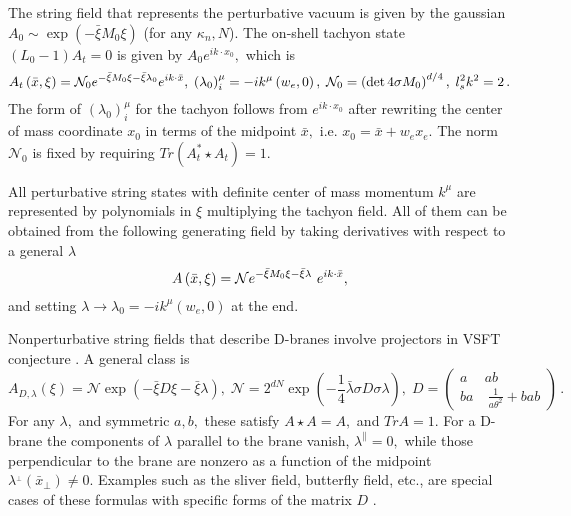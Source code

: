 \documentclass[a4paper,11pt]{article}
\begin{document}
The string field that represents the perturbative vacuum is given by the
gaussian $A_{0}\sim \exp \left( -\bar{\xi}M_{0}\xi \right) $ (for any $%
\kappa _{n},N$). The on-shell tachyon state $\left( L_{0}-1\right) A_{t}=0$
is given by $A_{0}e^{ik\cdot x_{0}},$ which is
\begin{equation}
A_{t}\left( \bar{x},\xi \right) =\mathcal{N}_{0}e^{-\bar{\xi}M_{0}\xi -\bar{%
\xi}\lambda _{0}}e^{ik\cdot \bar{x}},\;\left( \lambda _{0}\right) _{i}^{\mu
}=-ik^{\mu }\left( w_{e},0\right) ,\;\mathcal{N}_{0}=\left( \det 4\sigma
M_{0}\right) ^{d/4},\;l_{s}^{2}k^{2}=2\,.  \label{tach}
\end{equation}%
The form of $\left( \lambda _{0}\right) _{i}^{\mu }$ for the tachyon follows
from $e^{ik\cdot x_{0}}$ after rewriting the center of mass coordinate $%
x_{0} $ in terms of the midpoint $\bar{x},$ i.e. $x_{0}=\bar{x}+w_{e}x_{e}.$
The norm $\mathcal{N}_{0}$ is fixed by requiring $Tr\left( A_{t}^{\ast
}\star A_{t}\right) =1.$

All perturbative string states with definite center of mass momentum $k^{\mu
}$ are represented by polynomials in $\xi $ multiplying the tachyon field.
All of them can be obtained from the following generating field by taking
derivatives with respect to a general $\lambda $
\begin{equation}
A\left( \bar{x},\xi \right) ={\cal N} e^{-\bar{\xi}M_{0}\xi -\bar{\xi}\lambda}~e^{ik\cdot \bar{x}},
\end{equation}%
and setting $\lambda \rightarrow \lambda _{0}=-ik^{\mu }\left(
w_{e},0\right) $ at the end.

Nonperturbative string fields that describe D-branes involve projectors in
VSFT conjecture \cite{VSFT}. A general class is \cite{BM2}
\begin{equation}
A_{D,\lambda }\left( \xi \right) =\mathcal{N}\exp \left( -\bar{\xi}D\xi -%
\bar{\xi}\lambda \right) ,\;\mathcal{N}=2^{dN}\exp (-\frac{1}{4}\bar{\lambda}%
\sigma D\sigma \lambda ),\;D=\left(
\begin{array}{cc}
a & ab \\
ba & ~\frac{1}{a\theta^2}+bab%
\end{array}%
\right)\,.
\end{equation}%
For any $\lambda ,$ and symmetric $a,b,$ these satisfy $A\star A=A,$ and $%
TrA=1.$ For a D-brane the components of $\lambda $ parallel to the brane
vanish, $\lambda ^{\parallel }=0,$ while those perpendicular to the brane
are nonzero as a function of the midpoint $\lambda ^{_{\bot }}\left( \bar{x}%
_{\bot }\right) \neq 0.$ Examples such as the sliver field, butterfly field,
etc., are special cases of these formulas with specific forms of the matrix $%
D$ \cite{BM2}.
\end{document}
